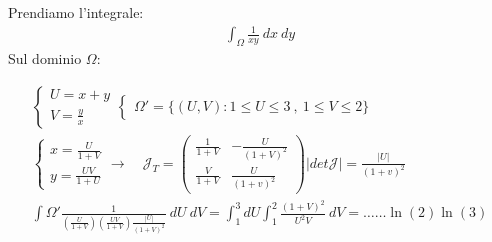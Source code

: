 \documentclass[a4paper, oneside]{article}
\begin{document}
\begin{example}
    Prendiamo l'integrale:
    \begin{gather*}
        \int_{\Omega} \frac{1}{xy} \ dx \ dy
    \end{gather*}
    Sul dominio $\Omega$:
    \begin{center}
    \end{center}
    \begin{gather*}
        \begin{cases}
            U = x+y\\
            V = \frac{y}{x}
        \end{cases}
        \begin{cases}
            \Omega' = \{ (U,V): 1 \leq U \leq 3 \ , \ 1 \leq V \leq 2\}
        \end{cases}\\
        \begin{cases}
            x= \frac{U}{1+V}\\
            y = \frac{UV}{1+U}
        \end{cases}\rightarrow
        \quad \mathcal{J}_T= \begin{pmatrix}
            \frac{1}{1+V} & -\frac{U}{(1+V)^2}\\
            \frac{V}{1+V} & \frac{U}{(1+v)^2}
        \end{pmatrix}\left\lvert det \mathcal{J} \right\rvert = \frac{\left\lvert U\right\rvert }{(1+v)^2}\\
        \int{\Omega'} \frac{1}{\left(\frac{U}{1+V}\right)\left(\frac{UV}{1+V}\right) \frac{\left\lvert U \right\rvert }{(1+V)^2} } \ dU \ dV = \int_{1}^{3} dU \int_{1}^{2} \frac{(1+V)^2}{U^2 V} \ dV =  \dots \dots \ln(2) \ln(3)\\
    \end{gather*}
\end{example}
\end{document}
